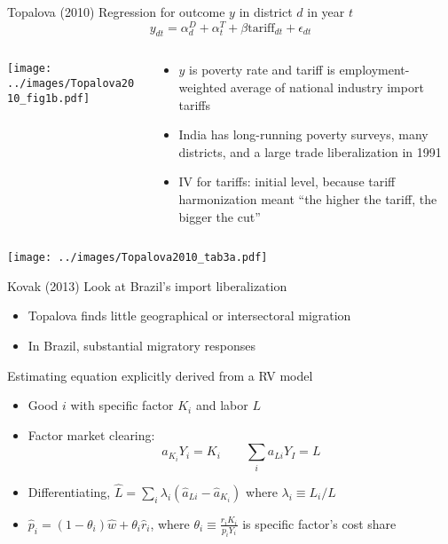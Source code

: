 \documentclass[10pt,notes=hide]{beamer}
\begin{document}
\begin{frame}{Topalova (2010)}
Regression for outcome $y$ in district $d$ in year $t$
	\begin{equation*}
		y_{dt} = \alpha_d^D + \alpha_t^T + \beta \text{tariff}_{dt} + \epsilon_{dt}
	\end{equation*}
\begin{columns}
\begin{column}{.4\textwidth}
\texttt{[image: ../images/Topalova2010\_fig1b.pdf]}
\end{column}
\begin{column}{.58\textwidth}
\begin{itemize}
	\item $y$ is poverty rate and tariff is employment-weighted average of national industry import tariffs
	\item India has long-running poverty surveys, many districts, and a large trade liberalization in 1991
	\item IV for tariffs: initial level, because tariff harmonization meant ``the higher the tariff, the bigger the cut''
\end{itemize}
\end{column}
\end{columns}
\end{frame}
\begin{frame}{}
\begin{center}
\texttt{[image: ../images/Topalova2010\_tab3a.pdf]}
\end{center}
\end{frame}
\begin{frame}{Kovak (2013)}
Look at Brazil's import liberalization
\begin{itemize}
	\item Topalova finds little geographical or intersectoral migration
	\item In Brazil, substantial migratory responses
\end{itemize}
Estimating equation explicitly derived from a RV model
\begin{itemize}
	\item Good $i$ with specific factor $K_i$ and labor $L$
	\item Factor market clearing:
	\begin{equation*}
	a_{K_i} Y_i = K_i \qquad \sum_{i} a_{Li} Y_I = L
	\end{equation*}
	\item Differentiating, $\hat{L} = \sum_i \lambda_i (\hat{a}_{Li} - \hat{a}_{K_i})$ where $\lambda_i \equiv L_i / L$
	\item $\hat{p}_i = (1-\theta_i)\hat{w} + \theta_i \hat{r}_i$, where $\theta_i \equiv \frac{r_iK_i}{p_i Y_i}$ is specific factor's cost share
\end{itemize}
\end{frame}
\end{document}
